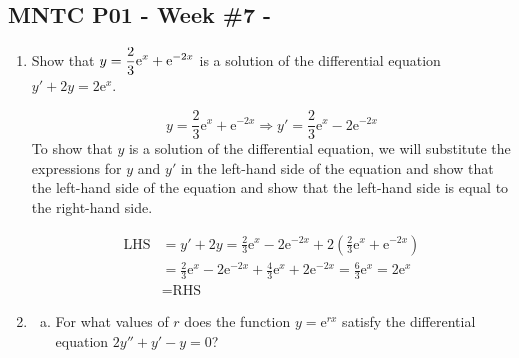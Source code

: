 




\begin{center}
\subsection*{MNTC P01 - Week \#7 - \WeekTitleSeven}
\end{center}

\begin{enumerate}

\subsection*{Verifying Solutions}
\item 
\begin{Question} %
  Show that $\displaystyle y = \frac{2}{3}\text{e}^{x} + \text{e}^{-2x}$ is a solution of the differential equation $y' + 2y = 2\text{e}^{x}$. \\
\end{Question}

\begin{Solution}
\begin{equation*}
y = \frac{2}{3}\text{e}^{x} + \text{e}^{-2x} \Rightarrow
y' = \frac{2}{3}\text{e}^{x} - 2\text{e}^{-2x}
\end{equation*}
To show that $y$ is a solution of the differential equation, we will substitute the expressions for $y$ and $y'$ in the left-hand side of the equation and show that the left-hand side of the equation and show that the left-hand side is equal to the right-hand side.

\begin{align*}
	\text{LHS} &= y' + 2y = \frac{2}{3}\text{e}^{x} - 2\text{e}^{-2x} + 2(\frac{2}{3}\text{e}^{x} + \text{e}^{-2x}) \\
	&= \frac{2}{3}\text{e}^{x} - 2\text{e}^{-2x} + 
	\frac{4}{3}\text{e}^{x} + 2\text{e}^{-2x} =
	\frac{6}{3}\text{e}^{x} = 2\text{e}^{x} \\ 
	&= \text{RHS}
\end{align*}
\end{Solution}

\item
\begin{Question}
\begin{enumerate}[(a)]
\item For what values of $r$ does the function $y = \text{e}^{rx}$ satisfy the differential equation $2y'' + y' - y = 0$?


\end{enumerate}
\end{Question}
\end{enumerate}

